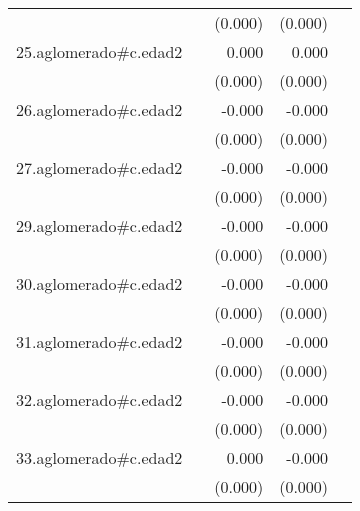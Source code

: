 {\begin{longtable}{l*{4}{D{.}{.}{-1}}}
            &                     &     (0.000)         &     (0.000)         &                     \\
\addlinespace
25.aglomerado#c.edad2&                     &       0.000         &       0.000         &                     \\
            &                     &     (0.000)         &     (0.000)         &                     \\
\addlinespace
26.aglomerado#c.edad2&                     &      -0.000         &      -0.000\sym{*}  &                     \\
            &                     &     (0.000)         &     (0.000)         &                     \\
\addlinespace
27.aglomerado#c.edad2&                     &      -0.000         &      -0.000         &                     \\
            &                     &     (0.000)         &     (0.000)         &                     \\
\addlinespace
29.aglomerado#c.edad2&                     &      -0.000         &      -0.000\sym{**} &                     \\
            &                     &     (0.000)         &     (0.000)         &                     \\
\addlinespace
30.aglomerado#c.edad2&                     &      -0.000\sym{*}  &      -0.000\sym{***}&                     \\
            &                     &     (0.000)         &     (0.000)         &                     \\
\addlinespace
31.aglomerado#c.edad2&                     &      -0.000         &      -0.000\sym{**} &                     \\
            &                     &     (0.000)         &     (0.000)         &                     \\
\addlinespace
32.aglomerado#c.edad2&                     &      -0.000         &      -0.000\sym{***}&                     \\
            &                     &     (0.000)         &     (0.000)         &                     \\
\addlinespace
33.aglomerado#c.edad2&                     &       0.000         &      -0.000\sym{***}&                     \\
            &                     &     (0.000)         &     (0.000)         &                     \\

\end{longtable}}
